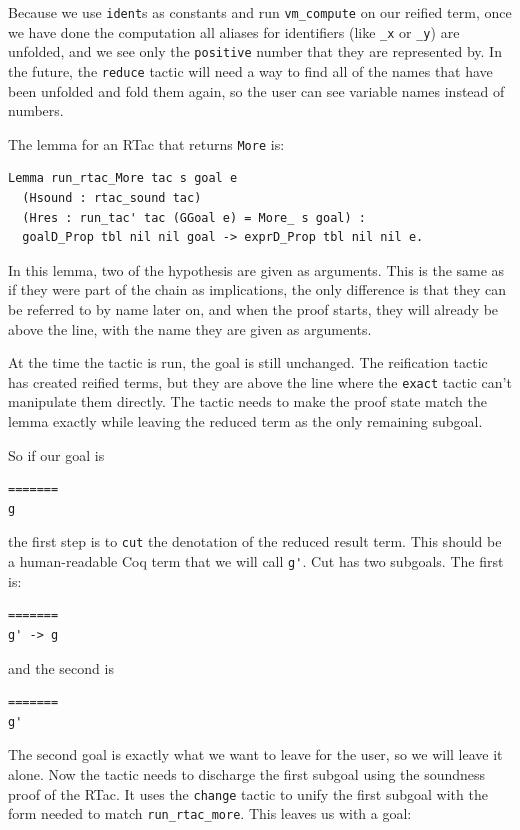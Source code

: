 \documentclass{puthesis}
\begin{document}
Because we use \lstinline|ident|s as constants and run
\lstinline|vm_compute| on our reified term, once we have done the
computation all aliases for identifiers (like \lstinline|_x| or
\lstinline|_y|) are unfolded, and we see only the \lstinline|positive|
number that they are represented by. In the future, the
\lstinline|reduce| tactic will need a way to find all of the names
that have been unfolded and fold them again, so the user can see
variable names instead of numbers. 

The lemma for an RTac that returns \lstinline|More| is:

\begin{lstlisting}
Lemma run_rtac_More tac s goal e
  (Hsound : rtac_sound tac) 
  (Hres : run_tac' tac (GGoal e) = More_ s goal) :
  goalD_Prop tbl nil nil goal -> exprD_Prop tbl nil nil e.
\end{lstlisting}

In this lemma, two of the hypothesis are given as arguments. This is
the same as if they were part of the chain as implications, the only
difference is that they can be referred to by name later on, and when
the proof starts, they will already be above the line, with the name
they are given as arguments.

At the time the tactic is run, the goal is still unchanged. The
reification tactic has created reified terms, but they are above the
line where the \lstinline|exact| tactic can't manipulate them
directly. The tactic needs to make the proof state match the lemma
exactly while leaving the reduced term as the only remaining
subgoal.

So if our goal is 

\begin{lstlisting}
=======
g
\end{lstlisting}

the first step is to \lstinline|cut| the denotation of the reduced
result term. This should be a human-readable Coq term that we will
call \lstinline|g'|. Cut has two subgoals. The first is:

\begin{lstlisting}
=======
g' -> g
\end{lstlisting}

and the second is

\begin{lstlisting}
=======
g'
\end{lstlisting}

The second goal is exactly what we want to leave for the user, so we
will leave it alone. Now the tactic needs to discharge the first
subgoal using the soundness proof of the RTac. It uses the
\lstinline|change| tactic to unify the first subgoal with the form
needed to match \lstinline|run_rtac_more|. This leaves us with a goal:
\end{document}
